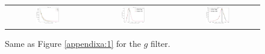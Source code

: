 \documentclass[preprintm,linenumbers]{aastex631}
\begin{document}
  \begin{figure}[h]
			\centering
			\begin{tabular}{c c c}
				
				\includegraphics[width=0.3\textwidth]{results/histograms_templates_tscale/hist_first_year_one_snap_v4_0_10yrs_db_noDD_noTwi_doALLTemplateMetrics_reduceNTemplate_g_noDD_noTwi.pdf} &
				\includegraphics[width=0.3\textwidth]{results/histograms_templates_tscale/hist_first_year_one_snap_v4_0_10yrs_db_noDD_noTwi_doALLTemplateMetrics_reduceSeeingTemplate_g_noDD_noTwi.pdf} &
				\includegraphics[width=0.3\textwidth]{results/histograms_templates_tscale/hist_first_year_one_snap_v4_0_10yrs_db_noDD_noTwi_doALLTemplateMetrics_reduceDepthTemplate_g_noDD_noTwi.pdf} \\
				
			\end{tabular}
			\caption{
				Same as Figure \ref{appendixa:1} for the $g$ filter.  \label{appendixa:2}
			}
		\end{figure}
\end{document}
